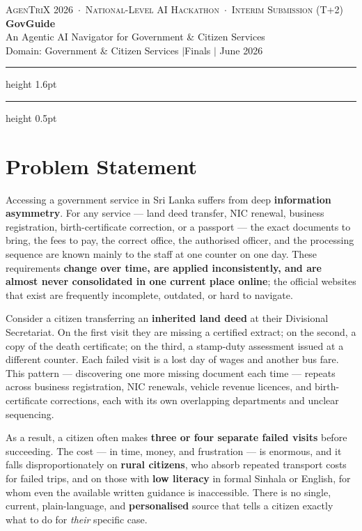 \documentclass[11pt,a4paper]{article}
\newcommand{\lead}[1]{\textbf{\color{ink}#1}}
\begin{document}
\thispagestyle{fancy}

\begin{center}
  {\small\color{soft}\textsc{AgenTriX 2026 \,$\cdot$\, National-Level AI Hackathon \,$\cdot$\, Interim Submission (T+2)}}\\[0.7em]
  {\Huge\bfseries\color{ink}GovGuide}\\[0.35em]
  {\large\color{soft}An Agentic AI Navigator for Government \& Citizen Services}\\[0.9em]
  {\small\color{ink}Domain: Government \& Citizen Services \quad$\vert$\quad Finals \quad$\vert$ June 2026}
\end{center}
\vspace{0.3em}
{\color{accent}\hrule height 1.6pt}
\vspace{0.4em}
{\color{rule}\hrule height 0.5pt}
\vspace{1.1em}

\section{Problem Statement}
Accessing a government service in Sri Lanka suffers from deep \lead{information asymmetry}. For any
service --- land deed transfer, NIC renewal, business registration, birth-certificate correction, or
a passport --- the exact documents to bring, the fees to pay, the correct office, the authorised
officer, and the processing sequence are known mainly to the staff at one counter on one day. These
requirements \lead{change over time, are applied inconsistently, and are almost never consolidated in one
current place online}; the official websites that exist are frequently incomplete, outdated, or hard
to navigate.

Consider a citizen transferring an \lead{inherited land deed} at their Divisional Secretariat. On the
first visit they are missing a certified extract; on the second, a copy of the death certificate; on
the third, a stamp-duty assessment issued at a different counter. Each failed visit is a lost day of
wages and another bus fare. This pattern --- discovering one more missing document each time ---
repeats across business registration, NIC renewals, vehicle revenue licences, and birth-certificate
corrections, each with its own overlapping departments and unclear sequencing.

As a result, a citizen often makes \lead{three or four separate failed visits} before succeeding. The
cost --- in time, money, and frustration --- is enormous, and it falls disproportionately on
\lead{rural citizens}, who absorb repeated transport costs for failed trips, and on those with
\lead{low literacy} in formal Sinhala or English, for whom even the available written guidance is
inaccessible. There is no single, current, plain-language, and \lead{personalised} source that tells a
citizen exactly what to do for \emph{their} specific case.
\end{document}
